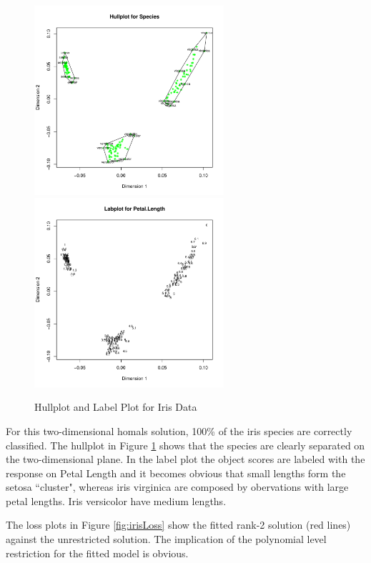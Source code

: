 \documentclass[article]{Z}
\begin{document}
\begin{figure}[hbt]
\begin{center}
\includegraphics[height=70mm, width=70mm]{irisHull.pdf}
\includegraphics[height=70mm, width=70mm]{irisLab.pdf}
\caption{\label{fig:iris}Hullplot and Label Plot for Iris Data}
\end{center}
\end{figure}

For this two-dimensional homals solution, 100\% of the iris species are correctly classified. The hullplot in Figure \ref{fig:iris} shows that the species are clearly separated on the two-dimensional plane. In the label plot the object scores are labeled with the response on Petal Length and it becomes obvious that small lengths form the setosa ``cluster", whereas iris virginica are composed by obervations with large petal lengths. Iris versicolor have medium lengths. 

The loss plots in Figure \ref{fig:irisLoss} show the fitted rank-2 solution (red lines) against the unrestricted solution. The implication of the polynomial level restriction for the fitted model is obvious.
\end{document}
